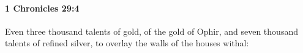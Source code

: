 
		\paragraph{1 Chronicles 29:4} %
			\label{1CHRONICLES-29-4}

			Even three thousand talents of gold, of the gold of Ophir, and seven thousand talents of refined silver, to overlay the walls of the houses withal:


